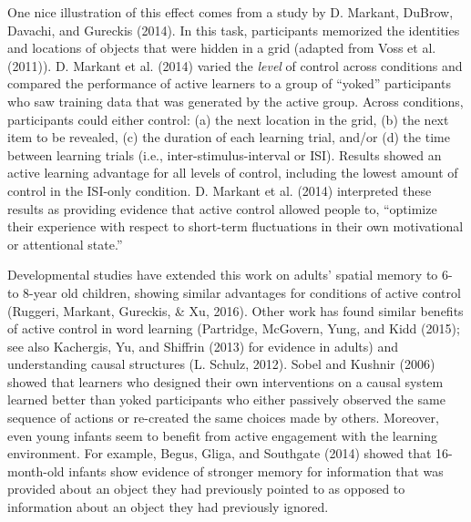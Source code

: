 \documentclass[english,man]{apa6}
\theoremstyle{definition}
\theoremstyle{definition}
\theoremstyle{definition}
\theoremstyle{remark}
\begin{document}
One nice illustration of this effect comes from a study by D. Markant,
DuBrow, Davachi, and Gureckis (2014). In this task, participants
memorized the identities and locations of objects that were hidden in a
grid (adapted from Voss et al. (2011)). D. Markant et al. (2014) varied
the \emph{level} of control across conditions and compared the
performance of active learners to a group of \enquote{yoked}
participants who saw training data that was generated by the active
group. Across conditions, participants could either control: (a) the
next location in the grid, (b) the next item to be revealed, (c) the
duration of each learning trial, and/or (d) the time between learning
trials (i.e., inter-stimulus-interval or ISI). Results showed an active
learning advantage for all levels of control, including the lowest
amount of control in the ISI-only condition. D. Markant et al. (2014)
interpreted these results as providing evidence that active control
allowed people to, \enquote{optimize their experience with respect to
short-term fluctuations in their own motivational or attentional state.}

Developmental studies have extended this work on adults' spatial memory
to 6- to 8-year old children, showing similar advantages for conditions
of active control (Ruggeri, Markant, Gureckis, \& Xu, 2016). Other work
has found similar benefits of active control in word learning
(Partridge, McGovern, Yung, and Kidd (2015); see also Kachergis, Yu, and
Shiffrin (2013) for evidence in adults) and understanding causal
structures (L. Schulz, 2012). Sobel and Kushnir (2006) showed that
learners who designed their own interventions on a causal system learned
better than yoked participants who either passively observed the same
sequence of actions or re-created the same choices made by others.
Moreover, even young infants seem to benefit from active engagement with
the learning environment. For example, Begus, Gliga, and Southgate
(2014) showed that 16-month-old infants show evidence of stronger memory
for information that was provided about an object they had previously
pointed to as opposed to information about an object they had previously
ignored.
\end{document}
